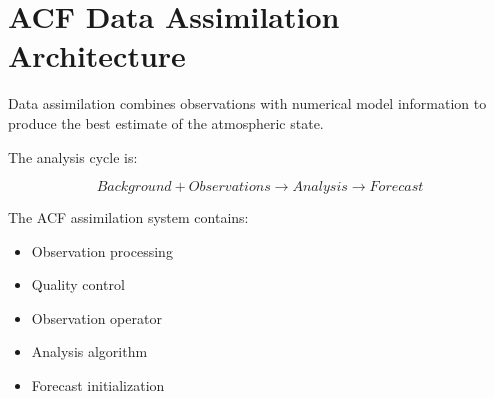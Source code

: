 \section{ACF Data Assimilation Architecture}


Data assimilation combines observations with numerical model
information to produce the best estimate of the atmospheric state.



The analysis cycle is:


\begin{equation}
Background
+
Observations
\rightarrow
Analysis
\rightarrow
Forecast
\end{equation}



The ACF assimilation system contains:


\begin{itemize}

\item Observation processing

\item Quality control

\item Observation operator

\item Analysis algorithm

\item Forecast initialization

\end{itemize}

